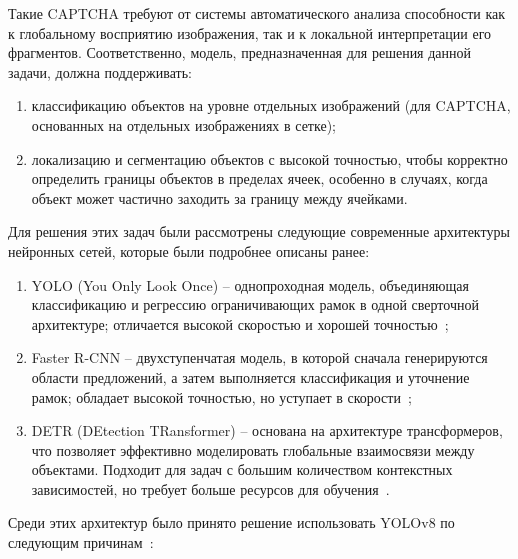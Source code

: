 Такие CAPTCHA требуют от системы автоматического анализа способности как к 
глобальному восприятию изображения, так и к локальной интерпретации его 
фрагментов. Соответственно, модель, предназначенная для решения данной задачи, 
должна поддерживать:

\begin{enumerate}
    \item классификацию объектов на уровне отдельных изображений (для CAPTCHA, 
    основанных на отдельных изображениях в сетке);
    \item локализацию и сегментацию объектов с высокой точностью, чтобы 
    корректно определить границы объектов в пределах ячеек, особенно в случаях, 
    когда объект может частично заходить за границу между ячейками.
\end{enumerate}

Для решения этих задач были рассмотрены следующие современные архитектуры 
нейронных сетей, которые были подробнее описаны ранее:

\begin{enumerate}
    \item YOLO (You Only Look Once) -- однопроходная модель, объединяющая 
    классификацию и регрессию ограничивающих рамок в одной сверточной 
    архитектуре; отличается высокой скоростью и хорошей точностью~\cite{yolo};
    \item Faster R-CNN -- двухступенчатая модель, в которой сначала генерируются 
    области предложений, а затем выполняется классификация и уточнение рамок; 
    обладает высокой точностью, но уступает в скорости~\cite{fasterrcnn};
    \item DETR (DEtection TRansformer) -- основана на архитектуре трансформеров, 
    что позволяет эффективно моделировать глобальные взаимосвязи между объектами. 
    Подходит для задач с большим количеством контекстных зависимостей, но требует 
    больше ресурсов для обучения~\cite{detr}.
\end{enumerate}

Среди этих архитектур было принято решение использовать YOLOv8 по следующим 
причинам~\cite{UltralyticsYOLOv8}:

